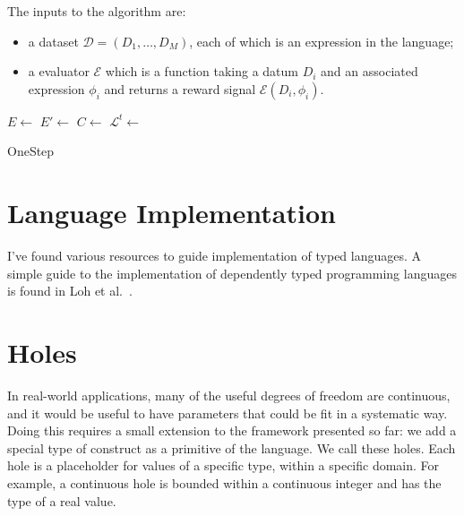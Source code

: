 \documentclass{article}
\begin{document}
The inputs to the algorithm are:
\begin{itemize}
\item a dataset $\mathcal{D} = (D_1, \dots, D_M)$, each of which is an
  expression in the language;
\item a evaluator $\mathcal{E}$ which is a function taking a datum
  $D_i$ and an associated expression $\phi_i$ and returns a reward
  signal $\mathcal{E}(D_i, \phi_i)$.
\end{itemize}

\begin{minipage}{.7\linewidth}
  \begin{algorithm}[H]
    \SetAlgoLined 
    $E \leftarrow $ \;
    $E' \leftarrow $ 
      \;
    $C \leftarrow$ \;
    $\mathcal{L}^t \leftarrow$ \;
    \caption{OneStep}
  \end{algorithm}
\end{minipage}


\section{Language Implementation}
I've found various resources to guide implementation of typed
languages.  A simple guide to the implementation of dependently typed
programming languages is found in Loh et al.~\cite{lowsimply}.

\section{Holes}
In real-world applications, many of the useful degrees of freedom are
continuous, and it would be useful to have parameters that could be
fit in a systematic way. Doing this requires a small extension to the
framework presented so far: we add a special type of construct as a
primitive of the language. We call these holes. Each hole is a
placeholder for values of a specific type, within a specific
domain. For example, a continuous hole is bounded within a continuous
integer and has the type of a real value.
\end{document}
